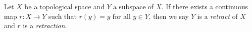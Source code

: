 \documentclass[12pt]{article}
\begin{document}
Let $X$ be a topological space and $Y$ a subspace of $X$. If there exists a continuous map $r:X \to Y$ such that $r(y)=y$ for all $y \in Y$, then we say $Y$ is a \emph{retract} of $X$ and $r$ is a \emph{retraction}.
\end{document}
